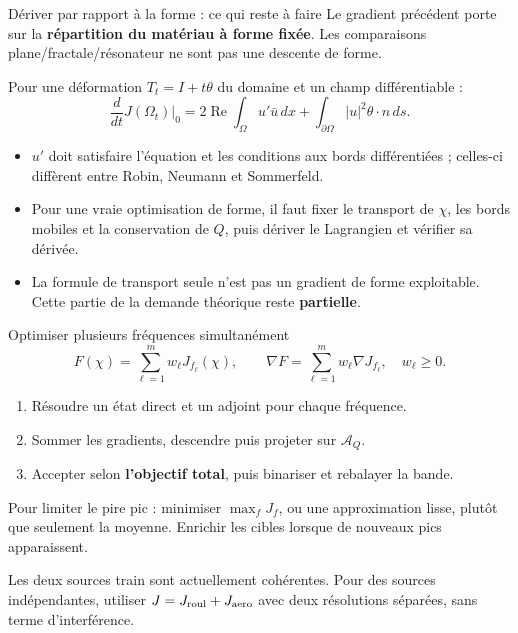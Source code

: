 \begin{frame}{Dériver par rapport à la forme : ce qui reste à faire}
\small Le gradient précédent porte sur la \textbf{répartition du matériau à forme fixée}.
Les comparaisons plane/fractale/résonateur ne sont pas une descente de forme.
\medskip

Pour une déformation $T_t=I+t\theta$ du domaine et un champ différentiable :
\[
 \frac{d}{dt}J(\Omega_t)\big|_{0}
 =2\operatorname{Re}\int_\Omega u'\bar u\,dx
  +\int_{\partial\Omega}|u|^2\theta\cdot n\,ds.
\]
\begin{itemize}
\item $u'$ doit satisfaire l'équation et les conditions aux bords différentiées ; celles-ci diffèrent entre Robin, Neumann et Sommerfeld.
\item Pour une vraie optimisation de forme, il faut fixer le transport de $\chi$, les bords mobiles et la conservation de $Q$, puis dériver le Lagrangien et vérifier sa dérivée.
\item La formule de transport seule n'est pas un gradient de forme exploitable. Cette partie de la demande théorique reste \textbf{partielle}.
\end{itemize}
\end{frame}

\begin{frame}{Optimiser plusieurs fréquences simultanément}
\[
 F(\chi)=\sum_{\ell=1}^m w_\ell J_{f_\ell}(\chi),\qquad
 \nabla F=\sum_{\ell=1}^m w_\ell\nabla J_{f_\ell},\quad w_\ell\geq0.
\]
\begin{enumerate}
\item Résoudre un état direct et un adjoint pour chaque fréquence.
\item Sommer les gradients, descendre puis projeter sur $\mathcal A_Q$.
\item Accepter selon \textbf{l'objectif total}, puis binariser et rebalayer la bande.
\end{enumerate}
\small Pour limiter le pire pic : minimiser $\max_f J_f$, ou une approximation lisse,
plutôt que seulement la moyenne. Enrichir les cibles lorsque de nouveaux pics apparaissent.
\medskip

Les deux sources train sont actuellement cohérentes. Pour des sources indépendantes,
utiliser $J=J_{\rm roul}+J_{\rm aero}$ avec deux résolutions séparées, sans terme d'interférence.
\end{frame}

